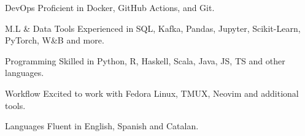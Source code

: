 

\begin{cvskills}

\cvskill
  {DevOps}
  {Proficient in Docker, GitHub Actions, and Git.}

\cvskill
  {M.L \& Data Tools}
  {Experienced in SQL, Kafka, Pandas, Jupyter, Scikit-Learn, PyTorch, W\&B and more.}

\cvskill
  {Programming}
  {Skilled in Python, R, Haskell, Scala, Java, JS, TS and other languages.}

\cvskill
  {Workflow}
  {Excited to work with Fedora Linux, TMUX, Neovim and additional tools.}

\cvskill
  {Languages}
  {Fluent in English, Spanish and Catalan.}


\end{cvskills}
